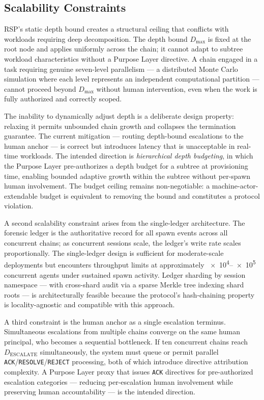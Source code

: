 \subsection{Scalability Constraints}
\label{sec:rs-scalability}

RSP's static depth bound creates a structural ceiling that conflicts with workloads requiring deep decomposition. The depth bound $D_{\max}$ is fixed at the root node and applies uniformly across the chain; it cannot adapt to subtree workload characteristics without a Purpose Layer directive. A chain engaged in a task requiring genuine seven-level parallelism --- a distributed Monte Carlo simulation where each level represents an independent computational partition --- cannot proceed beyond $D_{\max}$ without human intervention, even when the work is fully authorized and correctly scoped.

The inability to dynamically adjust depth is a deliberate design property: relaxing it permits unbounded chain growth and collapses the termination guarantee. The current mitigation --- routing depth-bound escalations to the human anchor --- is correct but introduces latency that is unacceptable in real-time workloads. The intended direction is \emph{hierarchical depth budgeting}, in which the Purpose Layer pre-authorizes a depth budget for a subtree at provisioning time, enabling bounded adaptive growth within the subtree without per-spawn human involvement. The budget ceiling remains non-negotiable: a machine-actor-extendable budget is equivalent to removing the bound and constitutes a protocol violation.

A second scalability constraint arises from the single-ledger architecture. The forensic ledger is the authoritative record for all spawn events across all concurrent chains; as concurrent sessions scale, the ledger's write rate scales proportionally. The single-ledger design is sufficient for moderate-scale deployments but encounters throughput limits at approximately \numrange{e4}{e5} concurrent agents under sustained spawn activity. Ledger sharding by session namespace --- with cross-shard audit via a sparse Merkle tree indexing shard roots --- is architecturally feasible because the protocol's hash-chaining property is locality-agnostic and compatible with this approach.

A third constraint is the human anchor as a single escalation terminus. Simultaneous escalations from multiple chains converge on the same human principal, who becomes a sequential bottleneck. If ten concurrent chains reach $D_{\text{ESCALATE}}$ simultaneously, the system must queue or permit parallel \texttt{ACK}/\texttt{RESOLVE}/\texttt{REJECT} processing, both of which introduce directive attribution complexity. A Purpose Layer proxy that issues \texttt{ACK} directives for pre-authorized escalation categories --- reducing per-escalation human involvement while preserving human accountability --- is the intended direction.


